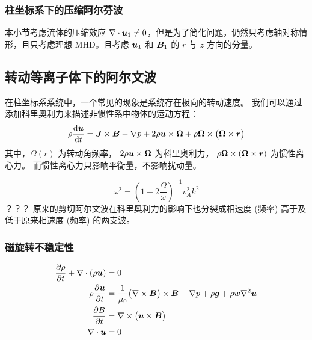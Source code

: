 \subsubsection{柱坐标系下的压缩阿尔芬波}

本小节考虑流体的压缩效应 $\nabla \cdot {\bm{u}_1} \neq 0$，但是为了简化问题，仍然只考虑轴对称情形，且只考虑理想 MHD。且考虑 $\bm{u}_1$ 和 $\bm{B}_1$ 的 $r$ 与 $z$ 方向的分量。

\subsection{转动等离子体下的阿尔文波}

在柱坐标系系统中，一个常见的现象是系统存在极向的转动速度。
我们可以通过添加科里奥利力来描述非惯性系中物体的运动方程：
\begin{equation}
\rho \frac{\mathop{}\!\mathrm{d} {\bm{u}}}{\mathop{}\!\mathrm{d} {t}} = \bm{J} \times \bm{B} - \nabla {p}
+ 2 \rho \bm{u} \times \bm{\Omega}
+ \rho \bm{\Omega} \times \big( \bm{\Omega} \times \bm{r} \big)
\end{equation}
其中，$\Omega(r)$ 为转动角频率，
$2 \rho \bm{u} \times \bm{\Omega}$ 为科里奥利力，
$\rho \bm{\Omega} \times ( \bm{\Omega} \times \bm{r} )$ 为惯性离心力。
而惯性离心力只影响平衡量，不影响扰动量。


\begin{equation}
\omega^2 = \left( 1 \mp 2 \frac{\Omega}{\omega} \right)^{-1} v_A^2 k^2
\end{equation}？？？
原来的剪切阿尔文波在科里奥利力的影响下也分裂成相速度 (频率) 高于及低于原来相速度 (频率) 的两支波。

\subsubsection{磁旋转不稳定性}

\begin{subequations}\begin{align}
\frac{\partial {\rho}}{\partial {t}} + \nabla \cdot {(\rho \bm{u})} &= 0 \\
\rho \frac{\partial {\bm{u}}}{\partial {t}} &= \frac{1}{\mu_0} \big(\nabla \times {\bm{B}}\big) \times \bm{B} - \nabla {p} + \rho \bm{g} + \rho w \nabla^2 {\bm{u}} \\
\frac{\partial {B}}{\partial {t}} &= \nabla \times {\big(\bm{u} \times \bm{B}\big)} \\
\nabla \cdot {\bm{u}} &= 0
\end{align}\end{subequations}

